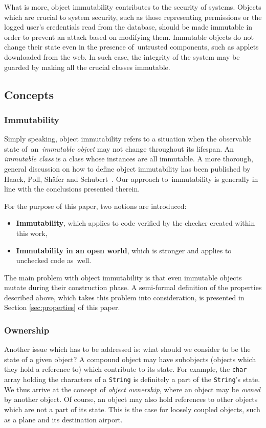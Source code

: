 \documentclass{pracamgr}
\theoremstyle{break}
\theoremstyle{break}
\theoremstyle{break}
\begin{document}
What is more, object immutability contributes to the security of
systems. Objects which are crucial to system security, such as those
representing permissions or the logged user's credentials read from
the database, should be made immutable in order to prevent an attack
based on modifying them. Immutable objects do not change their state
even in the presence of~untrusted components, such as applets
downloaded from the web. In such case, the integrity of the system may
be guarded by making all the crucial classes immutable.

\subsection{Concepts}

\subsubsection{Immutability}

Simply speaking, object immutability refers to a situation when the
observable state of~an~\emph{immutable object} may not change
throughout its lifespan. An \emph{immutable class} is a class whose
instances are all immutable. A more thorough, general discussion on
how to define object immutability has been published by Haack, Poll,
Shäfer and Schubert~\cite{jml-imm}. Our approach to~immutability is
generally in line with the conclusions presented therein.

For the purpose of this paper, two notions are introduced:
\begin{itemize}
\item \textbf{Immutability}, which applies to code verified by the
  checker created within this work,
\item \textbf{Immutability in an open world}, which is stronger and
  applies to unchecked code as~well. 
\end{itemize}

The main problem with object immutability is that even immutable
objects mutate during their construction phase. A semi-formal
definition of the properties described above, which takes this problem
into consideration, is presented in Section \ref{sec:properties} of
this paper.

\subsubsection{Ownership}

Another issue which has to be addressed is: what should we consider to
be the state of a given object? A compound object may have subobjects
(objects which they hold a reference to) which contribute to its
state. For example, the \texttt{char} array holding the characters of
a \texttt{String} is definitely a part of the \texttt{String}'s
state. We thus arrive at the concept of \emph{object ownership}, where
an object may be \emph{owned} by another object. Of course, an object
may also hold references to other objects which are not a part of its
state. This is the case for loosely coupled objects, such as a plane
and its destination airport. 
\end{document}

